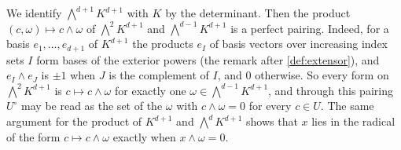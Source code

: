We identify $\bigwedge^{d+1} K^{d+1}$ with $K$ by the determinant. Then
the product $(c, \omega) \mapsto c \wedge \omega$ of
$\bigwedge^2 K^{d+1}$ and $\bigwedge^{d-1} K^{d+1}$ is a perfect
pairing. Indeed, for a basis $e_1, \dots, e_{d+1}$ of $K^{d+1}$ the
products $e_I$ of basis vectors over increasing index sets $I$ form bases
of the exterior powers (the remark after \cref{def:extensor}), and
$e_I \wedge e_J$ is $\pm 1$ when $J$ is the complement of $I$, and $0$
otherwise. So every form on $\bigwedge^2 K^{d+1}$ is
$c \mapsto c \wedge \omega$ for exactly one
$\omega \in \bigwedge^{d-1} K^{d+1}$, and through this pairing
$U^{\circ}$ may be read as the set of the $\omega$ with
$c \wedge \omega = 0$ for every $c \in U$. The same argument for the
product of $K^{d+1}$ and $\bigwedge^d K^{d+1}$ shows that $x$ lies in
the radical of the form $c \mapsto c \wedge \omega$ exactly when
$x \wedge \omega = 0$.

